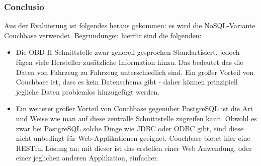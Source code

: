		\subsubsection{Conclusio}
		Aus der Evaluierung ist folgendes heraus gekommen: es wird die NoSQL-Variante Couchbase verwendet. Begründungen hierfür sind die folgenden:
			\begin{itemize}
				\item Die OBD-II Schnittstelle zwar generell gesprochen Standartisiert, jedoch fügen viele Hersteller zusätzliche Information hinzu. Das bedeutet das die Daten von Fahrzeug zu Fahrzeug unterschiedlich sind. Ein großer Vorteil von Couchbase ist, dass es kein Datenschema gibt - daher können prinzipiell jegliche Daten problemlos hinzugefügt werden.
				\item Ein weiterer großer Vorteil von Couchbase gegenüber PostgreSQL ist die Art und Weise wie man auf diese zentralle Schnittstelle zugreifen kann. Obwohl es zwar bei PostgreSQL solche Dinge wie JDBC oder ODBC gibt, sind diese nicht unbedingt für Web-Applikationen geeignet. Couchbase bietet hier eine RESTful Lösung an; mit dieser ist das erstellen einer Web Anwendung, oder einer jeglichen anderen Applikation, einfacher.
			\end{itemize}





